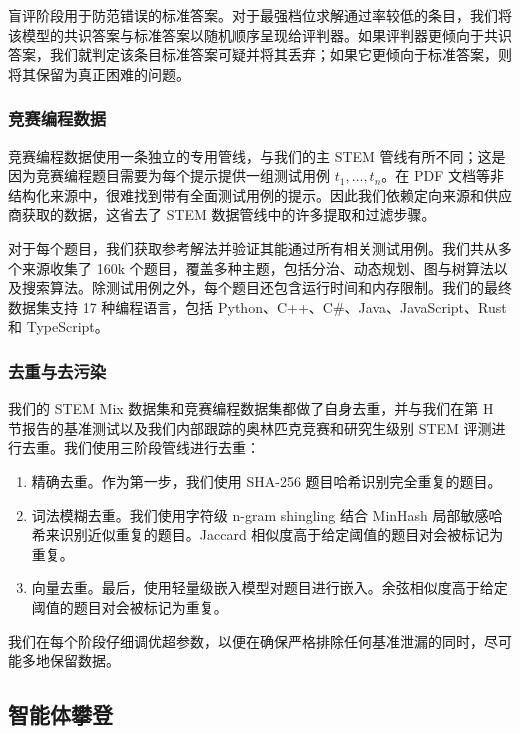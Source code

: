\documentclass[
  10
]{article}
\begin{document}
盲评阶段用于防范错误的标准答案。对于最强档位求解通过率较低的条目，我们将该模型的共识答案与标准答案以随机顺序呈现给评判器。如果评判器更倾向于共识答案，我们就判定该条目标准答案可疑并将其丢弃；如果它更倾向于标准答案，则将其保留为真正困难的问题。

\subsubsection{竞赛编程数据}\label{competitive-coding-data}

竞赛编程数据使用一条独立的专用管线，与我们的主 STEM 管线有所不同；这是因为竞赛编程题目需要为每个提示提供一组测试用例 \(t _ { 1 } , \ldots , t _ { n }\)。在 PDF 文档等非结构化来源中，很难找到带有全面测试用例的提示。因此我们依赖定向来源和供应商获取的数据，这省去了 STEM 数据管线中的许多提取和过滤步骤。

对于每个题目，我们获取参考解法并验证其能通过所有相关测试用例。我们共从多个来源收集了 160k 个题目，覆盖多种主题，包括分治、动态规划、图与树算法以及搜索算法。除测试用例之外，每个题目还包含运行时间和内存限制。我们的最终数据集支持 17 种编程语言，包括 Python、C++、C\#、Java、JavaScript、Rust 和 TypeScript。

\subsubsection{去重与去污染}\label{deduplication-and-decontamination}

我们的 STEM Mix 数据集和竞赛编程数据集都做了自身去重，并与我们在第 H 节报告的基准测试以及我们内部跟踪的奥林匹克竞赛和研究生级别 STEM 评测进行去重。我们使用三阶段管线进行去重：

\begin{enumerate}
\def\labelenumi{\arabic{enumi}.}
\item
  精确去重。作为第一步，我们使用 SHA-256 题目哈希识别完全重复的题目。
\item
  词法模糊去重。我们使用字符级 n-gram shingling 结合 MinHash 局部敏感哈希来识别近似重复的题目。Jaccard 相似度高于给定阈值的题目对会被标记为重复。
\item
  向量去重。最后，使用轻量级嵌入模型对题目进行嵌入。余弦相似度高于给定阈值的题目对会被标记为重复。
\end{enumerate}

我们在每个阶段仔细调优超参数，以便在确保严格排除任何基准泄漏的同时，尽可能多地保留数据。

\subsection{智能体攀登}\label{agentic-climb}
\end{document}
